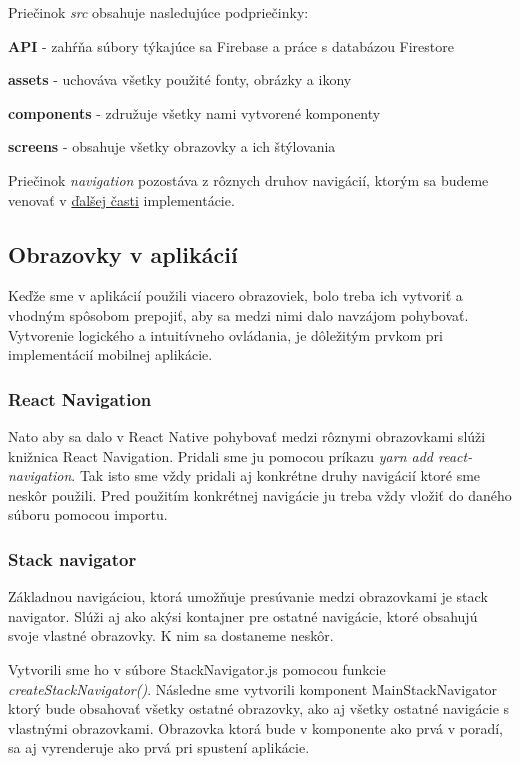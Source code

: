 Priečinok \textit{src} obsahuje nasledujúce podpriečinky:
\begin{itemize}
{\item \textbf{API} - zahŕňa súbory týkajúce sa Firebase a práce s databázou Firestore} 
{\item \textbf{assets} - uchováva všetky použité fonty, obrázky a ikony} 
{\item \textbf{components} - združuje všetky nami vytvorené komponenty} 
{\item \textbf{screens} - obsahuje všetky obrazovky a ich štýlovania}
\end{itemize}

Priečinok \textit{navigation} pozostáva z rôznych druhov navigácií, ktorým sa budeme venovať v \hyperref[sec:screens]{ďalšej časti} implementácie.

\subsection{Obrazovky v aplikácií}
\label{sec:screens}
Keďže sme v aplikácií použili viacero obrazoviek, bolo treba ich vytvoriť a vhodným spôsobom prepojiť, aby sa medzi nimi dalo navzájom pohybovať. Vytvorenie logického a intuitívneho ovládania, je dôležitým prvkom pri implementácií mobilnej aplikácie.
\subsubsection{React Navigation}
Nato aby sa dalo v React Native pohybovať medzi rôznymi obrazovkami slúži knižnica React Navigation. Pridali sme ju pomocou príkazu \textit{yarn add react-navigation}. Tak isto sme vždy pridali aj konkrétne druhy navigácií ktoré sme neskôr použili. Pred použitím konkrétnej navigácie ju treba vždy vložiť do daného súboru pomocou importu. 
\subsubsection{Stack navigator}
Základnou navigáciou, ktorá umožňuje presúvanie medzi obrazovkami je stack navigator. Slúži aj ako akýsi kontajner pre ostatné navigácie, ktoré obsahujú svoje vlastné obrazovky. K nim sa dostaneme neskôr.

Vytvorili sme ho v súbore StackNavigator.js pomocou funkcie \textit{createStackNavigator()}. Následne sme vytvorili komponent MainStackNavigator ktorý bude obsahovať všetky ostatné obrazovky, ako aj všetky ostatné navigácie s vlastnými obrazovkami. Obrazovka ktorá bude v komponente ako prvá v poradí, sa aj vyrenderuje ako prvá pri spustení aplikácie. 

